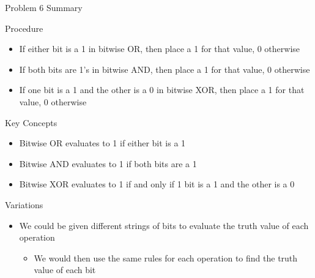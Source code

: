 \begin{summary}{Problem 6 Summary}
    \begin{statement}{Procedure}
        \begin{itemize}
            \item If either bit is a 1 in bitwise OR, then place a 1 for that value, 0 otherwise
            \item If both bits are 1's in bitwise AND, then place a 1 for that value, 0 otherwise
            \item If one bit is a 1 and the other is a 0 in bitwise XOR, then place a 1 for that value, 0 otherwise
        \end{itemize}
    \end{statement}
    \begin{statement}{Key Concepts}
        \begin{itemize}
            \item Bitwise OR evaluates to 1 if either bit is a 1
            \item Bitwise AND evaluates to 1 if both bits are a 1
            \item Bitwise XOR evaluates to 1 if and only if 1 bit is a 1 and the other is a 0
        \end{itemize}
    \end{statement}
    \begin{statement}{Variations}
        \begin{itemize}
            \item We could be given different strings of bits to evaluate the truth value of each operation
            \begin{itemize}
                \item We would then use the same rules for each operation to find the truth value of each bit
            \end{itemize}
        \end{itemize}
    \end{statement}
\end{summary}
